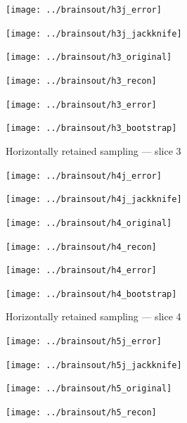 \documentclass[article]{jdssv}
\begin{document}
\begin{appendix}
\begin{figure}
\begin{centering}
\parbox{\imsize}{\texttt{[image: ../brainsout/h3j\_error]}}
\parbox{\imsize}{\texttt{[image: ../brainsout/h3j\_jackknife]}}

\vspace{\vertsep}

\parbox{\imsize}{\texttt{[image: ../brainsout/h3\_original]}}
\parbox{\imsize}{\texttt{[image: ../brainsout/h3\_recon]}}

\vspace{\vertsep}

\parbox{\imsize}{\texttt{[image: ../brainsout/h3\_error]}}
\parbox{\imsize}{\texttt{[image: ../brainsout/h3\_bootstrap]}}

\end{centering}
\caption{Horizontally retained sampling --- slice 3}
\end{figure}


\begin{figure}
\begin{centering}

\parbox{\imsize}{\texttt{[image: ../brainsout/h4j\_error]}}
\parbox{\imsize}{\texttt{[image: ../brainsout/h4j\_jackknife]}}

\vspace{\vertsep}

\parbox{\imsize}{\texttt{[image: ../brainsout/h4\_original]}}
\parbox{\imsize}{\texttt{[image: ../brainsout/h4\_recon]}}

\vspace{\vertsep}

\parbox{\imsize}{\texttt{[image: ../brainsout/h4\_error]}}
\parbox{\imsize}{\texttt{[image: ../brainsout/h4\_bootstrap]}}

\end{centering}
\caption{Horizontally retained sampling --- slice 4}
\end{figure}


\begin{figure}
\begin{centering}

\parbox{\imsize}{\texttt{[image: ../brainsout/h5j\_error]}}
\parbox{\imsize}{\texttt{[image: ../brainsout/h5j\_jackknife]}}

\vspace{\vertsep}

\parbox{\imsize}{\texttt{[image: ../brainsout/h5\_original]}}
\parbox{\imsize}{\texttt{[image: ../brainsout/h5\_recon]}}

\vspace{\vertsep}


\end{centering}
\end{figure}
\end{appendix}
\end{document}
